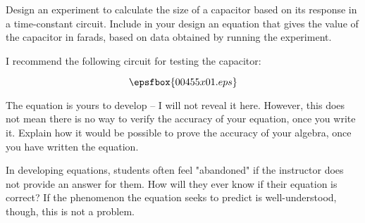 

Design an experiment to calculate the size of a capacitor based on its response in a time-constant circuit.  Include in your design an equation that gives the value of the capacitor in farads, based on data obtained by running the experiment.







I recommend the following circuit for testing the capacitor:

$$\epsfbox{00455x01.eps}$$

The equation is yours to develop -- I will not reveal it here.  However, this does not mean there is no way to verify the accuracy of your equation, once you write it.  Explain how it would be possible to prove the accuracy of your algebra, once you have written the equation.







In developing equations, students often feel "abandoned" if the instructor does not provide an answer for them.  How will they ever know if their equation is correct?  If the phenomenon the equation seeks to predict is well-understood, though, this is not a problem.




